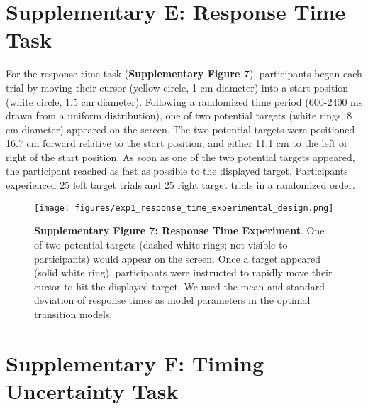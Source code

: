 \documentclass[man,floatsintext,letterpaper,12pt]{apa7}
\newcommand\boldblue[1]{\textcolor{mydarkblue}{\textbf{#1}}}
\begin{document}
\newpage
\section{Supplementary E: Response Time Task}

\noindent For the response time task (\boldblue{Supplementary Figure 7}), participants began each trial by moving their cursor (yellow circle, 1 cm diameter) into a start position (white circle, 1.5 cm diameter). Following a randomized time period (600-2400 ms drawn from a uniform distribution), one of two potential targets (white rings, 8 cm diameter) appeared on the screen. The two potential targets were positioned 16.7 cm forward relative to the start position, and either 11.1 cm to the left or right of the start position. As soon as one of the two potential targets appeared, the participant reached as fast as possible to the displayed target. Participants experienced 25 left target trials and 25 right target trials in a randomized order. 
\begin{figure}[H]
    \centering
    \texttt{[image: figures/exp1\_response\_time\_experimental\_design.png]}

    \caption*{\boldblue{Supplementary Figure 7: Response Time Experiment}. One of two potential targets (dashed white rings; not visible to participants) would appear on the screen. Once a target appeared (solid white ring), participants were instructed to rapidly move their cursor to hit the displayed target. We used the mean and standard deviation of response times as model parameters in the optimal transition models.}
\end{figure}

\newpage
\section{Supplementary F: Timing Uncertainty Task}
\end{document}
